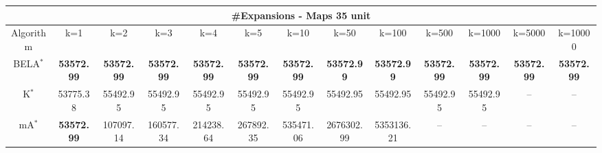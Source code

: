 \begin{tabular}{c|cccccccccccc}\toprule
\multicolumn{13}{c}{#Expansions - Maps 35 unit}\\ \midrule
Algorithm & k=1 & k=2 & k=3 & k=4 & k=5 & k=10 & k=50 & k=100 & k=500 & k=1000 & k=5000 & k=10000 \\ \midrule
BELA$^*$ & \textbf{53572.99} & \textbf{53572.99} & \textbf{53572.99} & \textbf{53572.99} & \textbf{53572.99} & \textbf{53572.99} & \textbf{53572.99} & \textbf{53572.99} & \textbf{53572.99} & \textbf{53572.99} & \textbf{53572.99} & \textbf{53572.99} \\
K$^*$ & 53775.38 & 55492.95 & 55492.95 & 55492.95 & 55492.95 & 55492.95 & 55492.95 & 55492.95 & 55492.95 & 55492.95 & -- & -- \\
mA$^*$ & \textbf{53572.99} & 107097.14 & 160577.34 & 214238.64 & 267892.35 & 535471.06 & 2676302.99 & 5353136.21 & -- & -- & -- & -- \\ \bottomrule 
\end{tabular}
